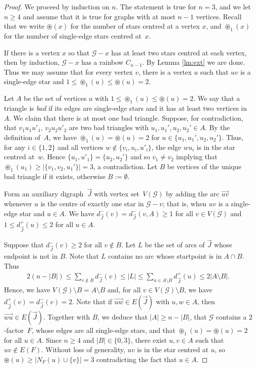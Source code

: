 \documentclass[a4paper, 12pt]{article}
\numberwithin{equation}{section}
\def\cen{\circledast}
\newcommand{\ova}[1]{\overrightarrow{#1}}
\newcommand{\ms}[1]{\mathscr{#1}}
\begin{document}
\begin{proof}
    We proceed by induction on $n$.
	The statement is true for $n=3$, and we let $n \geq 4$ and assume that it is true for graphs with at most $n-1$ vertices.
    Recall that we write $\cen(x)$ for the number of stars centred at a vertex $x$, and $\cen_1(x)$ for the number of single-edge stars centred at~$x$.

    If there is a vertex $x$ so that $\ms{G}-x$ has at least two stars centred at each vertex, then by induction, $\ms{G}-x$ has a rainbow $C_{n-1}$. By Lemma \ref{lm:ext} we are done.   
    Thus we may assume that for every vertex $v$, there is a vertex $u$ such that $uv$ is a single-edge star and $1 \leq \cen_1(u) \leq \cen(u)=2$.

    Let $A$ be the set of vertices $u$ with $1 \leq \cen_1(u) \leq \cen(u)=2$.
    We say that a triangle is \emph{bad} if its edges are single-edge stars and it has at least two vertices in $A$.
    We claim that there is at most one bad triangle. 
    Suppose, for contradiction, that $v_1u_1u'_1$, $v_2u_2u'_2$ are two bad triangles with $u_1,u_1',u_2,u_2' \in A$. 
    By the definition of~$A$, we have $\cen_1( u ) = \cen( u ) = 2$ for $u \in \{ u_1, u_1',u_2,u_2'\}$.
    Thus, for any $i \in \{ 1,2\}$ and all vertices $w \notin \{ v_i,u_i,u'_i\}$, the edge $w u_i$ is in the star centred at~$w$.
    Hence $\{u_1,u'_1\} = \{u_2,u_2'\}$ and so $ v_1 \ne v_2$ implying that $\cen_1(u_1) \ge |\{v_1,v_2, u_1'\}| = 3$, a contradiction. 
    Let $B$ be vertices of the unique bad triangle if it exists, otherwise $B := \emptyset$.


    Form an auxiliary digraph~$\ova{J}$ with vertex set~$V(\ms{G})$ by adding the arc $\ova{uv}$ whenever $u$ is the centre of exactly one star in $\ms{G}-v$; that is, when $uv$ is a single-edge star and $u \in A$.
    We have $d^-_{\ova{J}}(v) = d^-_{\ova{J}}(v,A) \geq 1$ for all $v \in V(\ms{G})$ and $1 \le d^+_{\ova{J}}(u) \le 2 $ for all $u \in A$. 
    
    Suppose that $d^-_{\ova{J}}(v) \geq 2$ for all $v \notin B$.
    Let $L$ be the set of arcs of $\ova{J}$ whose endpoint is not in $B$. Note that $L$ contains no arc whose startpoint is in $A \cap B$. 
    Thus
    \begin{align*}
        2(n - |B|) \le \sum_{v \notin B} d^-_{\ova{J}}(v) \le 
        |L| \le \sum_{u \in A \setminus B} d^+_{\ova{J}}(u) \le 2 |A \setminus B|.
    \end{align*}
    Hence, we have $V(\ms{G}) \setminus B = A \setminus B$ and, for all $v \in V(\ms{G}) \setminus B$, we have $d^+_{\ova{J}}(v) = d^-_{\ova{J}}(v) = 2$. 
    Note that if $\ova{u w} \in E( \ova{J} )$ with $u,w \in A$, then $\ova{w u} \in E( \ova{J})$.
    Together with $B$, we deduce that $|A| \ge n- |B|$,  that $\ms{G}$ contains a $2$-factor~$F$, whose edges are all single-edge stars, and that $\cen_1( u ) = \cen( u ) = 2$ for all $u \in A$.
    Since $n \ge 4$ and $|B| \in \{0,3\}$, there exist $u,v \in A$ such that $uv \notin E(F)$. 
    Without loss of generality, $uv$ is in the star centred at $u$, so $\cen( u ) \ge |N_F(u) \cup \{v\}| = 3$ contradicting the fact that $u \in A$. 
    

\end{proof}
\end{document}
